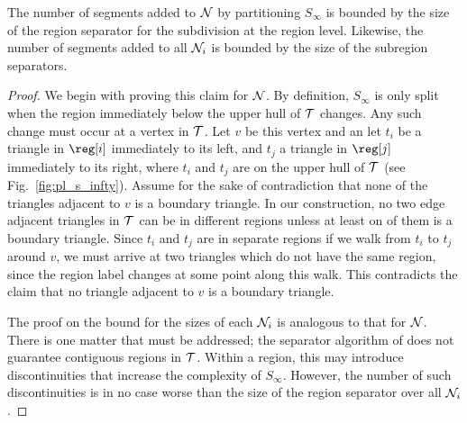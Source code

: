 {\begin{lemma}\label{lem:size_s_infty}
The number of segments added to $\mathcal{N}$ by partitioning $S_{\infty}$
is bounded by the size of the region separator for the subdivision
at the region level. Likewise, the number of segments added 
to all $\mathcal{N}_i$ is bounded by the size of the subregion separators.
\end{lemma}

\begin{proof}
We begin with proving this claim for $\mathcal{N}$.
By definition, $S_{\infty}$ is only split when the region immediately
below the upper hull of $\mathcal{T}$ changes.
Any such change must occur at a vertex in $\mathcal{T}$.
Let $v$ be this vertex and an let $t_i$ be a triangle in $\reg[i]$ 
immediately to its left, and $t_j$ a triangle in $\reg[j]$ immediately
to its right, where $t_i$ and $t_j$ are on the upper hull of
$\mathcal{T}$ (see Fig.~\ref{fig:pl_s_infty}).
Assume for the sake of contradiction that none of the triangles
adjacent to $v$ is a boundary triangle. 
In our construction, no two edge adjacent triangles in $\mathcal{T}$
can be in different regions unless at least on of them is
a boundary triangle.
Since $t_i$ and $t_j$ are in separate regions if we walk 
from $t_i$ to $t_j$ around $v$, we must arrive at two 
triangles which do not have the same region, since the
region label changes at some point along this walk.
This contradicts the claim that no triangle adjacent to $v$ is 
a boundary triangle.

The proof on the bound for the sizes of each $\mathcal{N}_i$ is 
analogous to that for $\mathcal{N}$.
There is one matter that must be addressed;
the separator algorithm of \cite{Frederickson87} does
not guarantee contiguous regions in $\mathcal{T}$.
Within a region, this may introduce discontinuities 
that increase the complexity of $S_{\infty}$.
However, the number of such discontinuities is in no case
worse than the size of the region separator over
all $\mathcal{N}_i$. 

\end{proof}

}
